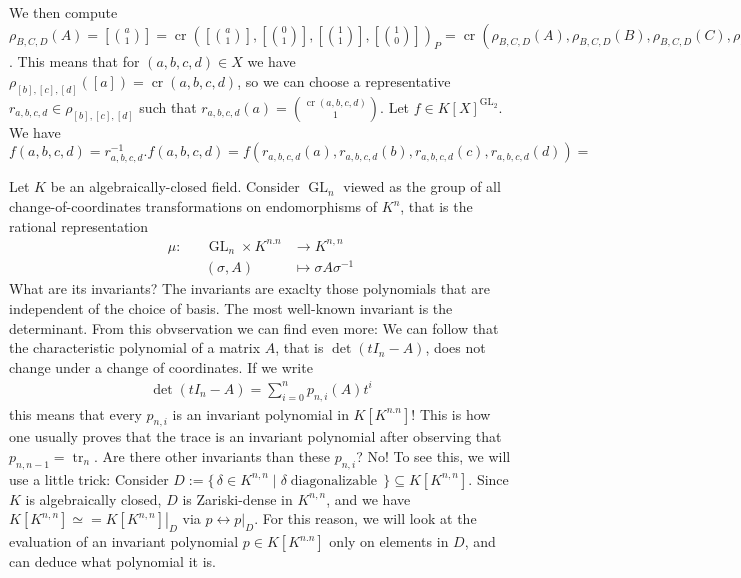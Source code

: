 \begin{example}
  We then compute $\rho_{B,C,D} (A) = [\binom{a}{1}] = \operatorname{cr}([\binom{a}{1}],[\binom{0}{1}],[\binom{1}{1}],[\binom{1}{0}])_P = \operatorname{cr}(\rho_{B,C,D}(A),\rho_{B,C,D}(B),\rho_{B,C,D}(C),\rho_{B,C,D}(D))_P = \operatorname{cr}(A,B,C,D)_P$.
  This means that for $(a,b,c,d) \in X$ we have $\rho_{[b],[c],[d]} ([a]) = \operatorname{cr}(a,b,c,d)$, so we can choose a representative $r_{a,b,c,d} \in \rho_{[b],[c],[d]}$ such that $r_{a,b,c,d}(a) = \binom{\operatorname{cr}(a,b,c,d)}{1}$.
  Let $f \in K[X]^{\operatorname{GL}_2}$.
  We have $f(a,b,c,d) = r_{a,b,c,d}^{-1}.f (a,b,c,d) = f(r_{a,b,c,d}(a),r_{a,b,c,d}(b),r_{a,b,c,d}(c),r_{a,b,c,d}(d)) = $
\end{example}

\begin{example}
  Let $K$ be an algebraically-closed field.
  Consider $\operatorname{GL}_n$ viewed as the group of all change-of-coordinates transformations on endomorphisms of $K^n$, that is the rational representation
  \begin{equation}
    \begin{aligned}
      \mu \colon && \operatorname{GL}_n \times K^{n.n} & \longrightarrow K^{n,n} \\
      && (\sigma,A) &\longmapsto \sigma A \sigma^{-1}
    \end{aligned}
  \end{equation}
  What are its invariants?
  The invariants are exaclty those polynomials that are independent of the choice of basis.
  The most well-known invariant is the determinant.
  From this obvservation we can find even more:
  We can follow that the characteristic polynomial of a matrix $A$, that is $\operatorname{det} (tI_n - A)$, does not change under a change of coordinates.
  If we write
  \begin{equation}
    \begin{aligned}
      \operatorname{det} (tI_n - A) = \sum_{i=0}^n p_{n,i} (A) t^i
    \end{aligned}
  \end{equation}
  this means that every $p_{n,i}$ is an invariant polynomial in $K[K^{n.n}]$!
  This is how one usually proves that the trace is an invariant polynomial after observing that $p_{n,n-1} = \operatorname{tr}_n$.
  Are there other invariants than these $p_{n,i}$?
  No!
  To see this, we will use a little trick:
  Consider $D := \{\, \delta \in K^{n,n} \mid \delta \operatorname{diagonalizable} \,\} \subseteq K[K^{n,n}]$.
  Since $K$ is algebraically closed, $D$ is Zariski-dense in $K^{n,n}$, and we have $K[K^{n,n}] \simeq = \left. K[K^{n,n}] \right|_{D}$ via $p \leftrightarrow \left. p \right|_{D}$.
  For this reason, we will look at the evaluation of an invariant polynomial $p \in K[K^{n.n}] $ only on elements in $D$, and can deduce what polynomial it is.


\end{example}
